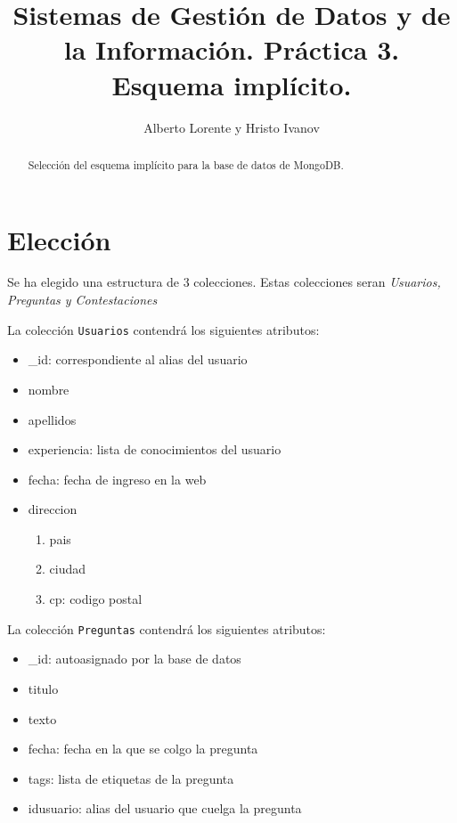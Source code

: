 \documentclass{article}
\begin{document}
\title{Sistemas de Gestión de Datos y de la Información. Práctica 3. \\ Esquema implícito.}
\author{Alberto Lorente y Hristo Ivanov}
\maketitle

  \begin{abstract}
     Selección del esquema implícito para la base de datos de MongoDB.
  \end{abstract}

  \section{Elección}
    Se ha elegido una estructura de 3 colecciones. Estas colecciones seran \emph{Usuarios, Preguntas y Contestaciones}
    \par
    La colección \texttt{Usuarios} contendrá los siguientes atributos:   
    \begin{itemize}  
        \item \_id: correspondiente al alias del usuario 
        \item nombre
        \item apellidos
        \item experiencia: lista de conocimientos del usuario
        \item fecha: fecha de ingreso en la web
        \item direccion
        \begin{enumerate}
          \item pais
          \item ciudad
          \item cp: codigo postal
        \end{enumerate}
    \end{itemize}
    \par
    La colección \texttt{Preguntas} contendrá los siguientes atributos:   
    \begin{itemize}  
        \item \_id: autoasignado por la base de datos 
        \item titulo
        \item texto
        \item fecha: fecha en la que se colgo la pregunta
        \item tags: lista de etiquetas de la pregunta
        \item idusuario: alias del usuario que cuelga la pregunta
    \end{itemize}
\end{document}
